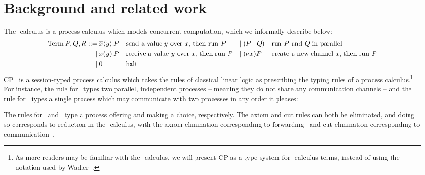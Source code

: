 \documentclass[a4paper,UKenglish]{article}
\begin{document}
\section*{Background and related work}
The \textpi-calculus is a process calculus which models concurrent computation,
which we informally describe below:
\[\!
  \begin{aligned}
    \text{Term} \; P, Q, R
    ::=   &\;\overline{x}\langle y \rangle.P &&\text{send a value $y$ over $x$, then run $P$}
     &\mid&\;(P \mid Q)  &&\text{run $P$ and $Q$ in parallel}
    \\\mid&\;x(y).P &&\text{receive a value $y$ over $x$, then run $P$}
     &\mid&\;(\nu x)P    &&\text{create a new channel $x$, then run $P$}
    \\\mid&\;0          &&\text{halt}
  \end{aligned}
\]
CP~\cite{wadler2012} is a session-typed process calculus which takes the rules
of classical linear logic as prescribing the typing rules of a process
calculus.\footnote{%
  As more readers may be familiar with the \textpi-calculus, we will present CP
  as a type system for \textpi-calculus terms, instead of using the notation
  used by Wadler~\cite{wadler2012}.
}
For instance, the rule for \llTens\ types two parallel, independent processes --
meaning they do not share any communication channels -- and the rule for
\llParr\ types a single process which may communicate with two processes in any
order it pleases: 
\begin{center}
  \begin{prooftree*}
    \SYM{\llTens}
  \end{prooftree*}
  \begin{prooftree*}
    \SYM{\llParr}
  \end{prooftree*}
\end{center}
The rules for \llWith\ and \llPlus\ type a process offering and making a choice,
respectively. The axiom and cut rules can both be eliminated, and doing so
corresponds to reduction in the \textpi-calculus, with the axiom elimination
corresponding to forwarding~\cite{boreale1998,wadler2012} and cut elimination
corresponding to communication~\cite{wadler2012}.
\end{document}
